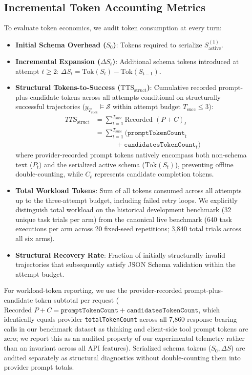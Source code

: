 \subsection{Incremental Token Accounting Metrics}
To evaluate token economics, we audit token consumption at every turn:
\begin{itemize}
    \item \textbf{Initial Schema Overhead ($S_0$)}: Tokens required to serialize $S_{\text{active}}^{(1)}$.
    \item \textbf{Incremental Expansion ($\Delta S_t$)}: Additional schema tokens introduced at attempt $t \ge 2$: $\Delta S_t = \text{Tok}(S_t) - \text{Tok}(S_{t-1})$.
    \item \textbf{Structural Tokens-to-Success ($\text{TTS}_{\text{struct}}$)}: Cumulative recorded prompt-plus-candidate tokens across all attempts conditional on structurally successful trajectories ($y_{T_{\text{succ}}} \models \mathcal{S}$ within attempt budget $T_{\text{succ}} \le 3$):
    \begin{equation}
    \begin{split}
    TTS_{\text{struct}} &= \sum_{t=1}^{T_{\text{succ}}} \text{Recorded } (P+C)_t \\
    &= \sum_{t=1}^{T_{\text{succ}}} \bigl( \texttt{promptTokenCount}_t \\
    &\qquad\quad + \texttt{candidatesTokenCount}_t \bigr)
    \end{split}
    \end{equation}
    where provider-recorded prompt tokens natively encompass both non-schema text ($P_t$) and the serialized active schema ($\text{Tok}(S_t)$), preventing offline double-counting, while $C_t$ represents candidate completion tokens.
    \item \textbf{Total Workload Tokens}: Sum of all tokens consumed across all attempts up to the three-attempt budget, including failed retry loops. We explicitly distinguish total workload on the historical development benchmark (32 unique task trials per arm) from the canonical live benchmark (640 task executions per arm across 20 fixed-seed repetitions; 3,840 total trials across all six arms).
    \item \textbf{Structural Recovery Rate}: Fraction of initially structurally invalid trajectories that subsequently satisfy JSON Schema validation within the attempt budget.
\end{itemize}
For workload-token reporting, we use the provider-recorded prompt-plus-candidate token subtotal per request ($\text{Recorded } P+C = \texttt{promptTokenCount} + \texttt{candidatesTokenCount}$, which identically equals provider \texttt{totalTokenCount} across all 7,860 response-bearing calls in our benchmark dataset as thinking and client-side tool prompt tokens are zero; we report this as an audited property of our experimental telemetry rather than an invariant across all API features). Serialized schema tokens ($S_0, \Delta S$) are audited separately as structural diagnostics without double-counting them into provider prompt totals.

